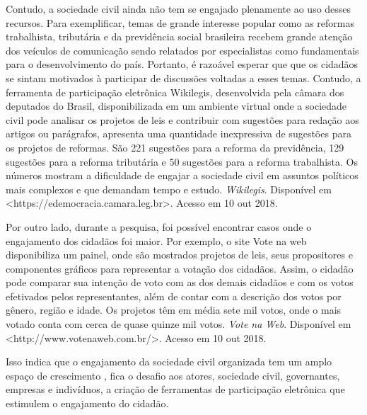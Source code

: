 \par
Contudo, a sociedade civil ainda não tem se engajado plenamente ao uso desses recursos. Para exemplificar, temas de grande interesse popular 
como as reformas trabalhista, tributária e da previdência social brasileira recebem grande atenção dos veículos de comunicação sendo relatados por especialistas como fundamentais 
para o desenvolvimento do país. Portanto, é razoável esperar que que os cidadãos se sintam motivados à participar de discussões voltadas a esses temas. 
Contudo, a ferramenta de participação eletrônica Wikilegis, desenvolvida pela câmara dos deputados do Brasil, disponibilizada em um ambiente virtual onde a sociedade civil pode analisar
 os projetos de leis e contribuir com sugestões para redação aos artigos ou parágrafos, apresenta uma quantidade inexpressiva de sugestões para os projetos de reformas. 
 São 221 sugestões para a reforma da previdência, 129 sugestões para a reforma tributária e  50 sugestões para a reforma trabalhista.  Os números mostram a dificuldade de engajar 
 a sociedade civil em assuntos políticos mais complexos e que demandam tempo e estudo. \textit{Wikilegis}. Disponível em <https://edemocracia.camara.leg.br>. Acesso em 10 out 2018. 

\par
Por outro lado, durante a pesquisa, foi possível encontrar casos onde o engajamento dos cidadãos foi maior. Por exemplo, o site Vote na web disponibiliza um painel, onde são mostrados projetos de leis, 
seus propositores e componentes gráficos para representar a votação dos cidadãos.
Assim, o cidadão pode comparar sua intenção de voto com as dos demais cidadãos e com os votos efetivados pelos representantes, além de contar com a descrição dos votos por gênero,
região e idade. Os projetos têm em média sete mil votos, onde o mais votado conta com cerca de quase quinze mil votos. \textit{Vote na Web}. Disponível em <http://www.votenaweb.com.br/>.
Acesso em 10 out 2018.

\par
Isso indica que o engajamento da sociedade civil organizada tem um amplo espaço de crescimento \cite{o2011government}, fica o desafio aos atores, sociedade civil, governantes, 
empresas e indivíduos, a criação de ferramentas de participação eletrônica que estimulem o engajamento do cidadão.



